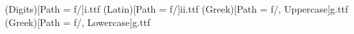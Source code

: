 \usepackage{mathspec}

\setmainfont[
	Path = f/,
	BoldFont=ib.ttf,
	ItalicFont=ii.ttf,
	BoldItalicFont=ibi.ttf
		]{i.ttf}
		
\setmathfont(Digits)[Path = f/]{i.ttf}
\setmathfont(Latin)[Path = f/]{ii.ttf}
\setmathfont(Greek)[Path = f/, Uppercase]{g.ttf}
\setmathfont(Greek)[Path = f/, Lowercase]{g.ttf}

